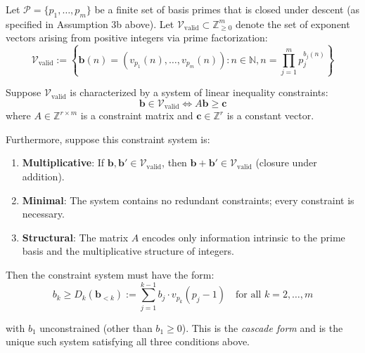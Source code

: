 \begin{theorem}
\label{thm:cascade-uniqueness}

Let $\mathcal{P} = \{p_1, \ldots, p_m\}$ be a finite set of basis primes that is closed under descent (as specified in Assumption 3b above). Let $\mathcal{V}_{\text{valid}} \subset \mathbb{Z}_{\geq 0}^m$ denote the set of exponent vectors arising from positive integers via prime factorization:
\begin{equation}
\mathcal{V}_{\text{valid}} := \left\{\mathbf{b}(n) = (v_{p_1}(n), \ldots, v_{p_m}(n)) : n \in \mathbb{N}, n = \prod_{j=1}^m p_j^{b_j(n)}\right\}
\end{equation}

Suppose $\mathcal{V}_{\text{valid}}$ is characterized by a system of linear inequality constraints:
\begin{equation}
\label{eq:general-constraint-system}
\mathbf{b} \in \mathcal{V}_{\text{valid}} \iff A\mathbf{b} \geq \mathbf{c}
\end{equation}
where $A \in \mathbb{Z}^{r \times m}$ is a constraint matrix and $\mathbf{c} \in \mathbb{Z}^r$ is a constant vector.

Furthermore, suppose this constraint system is:
\begin{enumerate}
\item \textbf{Multiplicative}: If $\mathbf{b}, \mathbf{b}' \in \mathcal{V}_{\text{valid}}$, then $\mathbf{b} + \mathbf{b}' \in \mathcal{V}_{\text{valid}}$ (closure under addition).
\item \textbf{Minimal}: The system contains no redundant constraints; every constraint is necessary.
\item \textbf{Structural}: The matrix $A$ encodes only information intrinsic to the prime basis and the multiplicative structure of integers.
\end{enumerate}

Then the constraint system must have the form:
\begin{equation}
b_k \geq D_k(\mathbf{b}_{<k}) := \sum_{j=1}^{k-1} b_j \cdot v_{p_k}(p_j - 1) \quad \text{for all } k = 2, \ldots, m
\end{equation}

with $b_1$ unconstrained (other than $b_1 \geq 0$). This is the \emph{cascade form} and is the unique such system satisfying all three conditions above.

\end{theorem}

